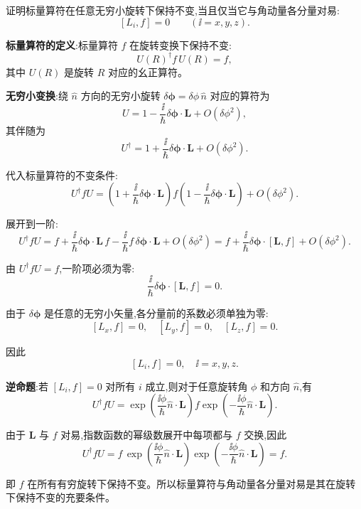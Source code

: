 \begin{question}
证明标量算符在任意无穷小旋转下保持不变,当且仅当它与角动量各分量对易:
\[
[L_i,f]=0\qquad (\ii=x,y,z).
\]
\begin{solution}
	\textbf{标量算符的定义}:标量算符 $f$ 在旋转变换下保持不变:
	\[
	U(R)^\dagger f\,U(R) = f,
	\]
	其中 $U(R)$ 是旋转 $R$ 对应的幺正算符。

	\textbf{无穷小变换}:绕 $\hat n$ 方向的无穷小旋转 $\delta\boldsymbol\phi = \delta\phi\,\hat n$ 对应的算符为
	\[
	U = 1 - \frac{\ii}{\hbar}\delta\boldsymbol\phi\cdot\mathbf L + O(\delta\phi^2),
	\]
	其伴随为
	\[
	U^\dagger = 1 + \frac{\ii}{\hbar}\delta\boldsymbol\phi\cdot\mathbf L + O(\delta\phi^2).
	\]

	代入标量算符的不变条件:
	\[
	U^\dagger f U = \left(1+\frac{\ii}{\hbar}\delta\boldsymbol\phi\cdot\mathbf L\right)
	f\left(1-\frac{\ii}{\hbar}\delta\boldsymbol\phi\cdot\mathbf L\right) + O(\delta\phi^2).
	\]

	展开到一阶:
	\[
	U^\dagger f U = f + \frac{\ii}{\hbar}\delta\boldsymbol\phi\cdot\mathbf L\,f
	- \frac{\ii}{\hbar}f\,\delta\boldsymbol\phi\cdot\mathbf L + O(\delta\phi^2)
	= f + \frac{\ii}{\hbar}\delta\boldsymbol\phi\cdot[\mathbf L,f] + O(\delta\phi^2).
	\]

	由 $U^\dagger f U = f$,一阶项必须为零:
	\[
	\frac{\ii}{\hbar}\delta\boldsymbol\phi\cdot[\mathbf L,f] = 0.
	\]

	由于 $\delta\boldsymbol\phi$ 是任意的无穷小矢量,各分量前的系数必须单独为零:
	\[
	[L_x,f]=0,\quad [L_y,f]=0,\quad [L_z,f]=0.
	\]

	因此
	\[
	\boxed{[L_i,f]=0,\quad \ii=x,y,z}.
	\]

	\textbf{逆命题}:若 $[L_i,f]=0$ 对所有 $i$ 成立,则对于任意旋转角 $\phi$ 和方向 $\hat n$,有
	\[
	U^\dagger f U = \exp\!\left(\frac{\ii\phi}{\hbar}\hat n\cdot\mathbf L\right) f
	\exp\!\left(-\frac{\ii\phi}{\hbar}\hat n\cdot\mathbf L\right).
	\]

	由于 $\mathbf L$ 与 $f$ 对易,指数函数的幂级数展开中每项都与 $f$ 交换,因此
	\[
	U^\dagger f U = f\,\exp\!\left(\frac{\ii\phi}{\hbar}\hat n\cdot\mathbf L\right)
	\exp\!\left(-\frac{\ii\phi}{\hbar}\hat n\cdot\mathbf L\right)=f.
	\]

	即 $f$ 在所有有穷旋转下保持不变。所以标量算符与角动量各分量对易是其在旋转下保持不变的充要条件。
	\end{solution}
\end{question}

